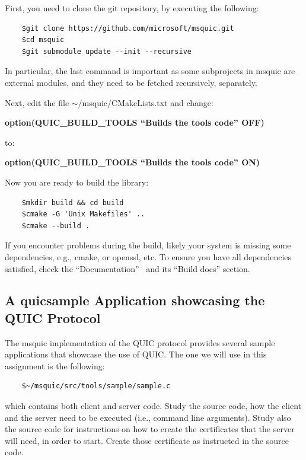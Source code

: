 \documentclass[11pt]{article}
\begin{document}
First, you need to clone the git repository, by executing the following:

\begin{verbatim}
    $git clone https://github.com/microsoft/msquic.git
    $cd msquic
    $git submodule update --init --recursive
\end{verbatim}

In particular, the last command is important as some subprojects in msquic are external modules, and they need to be fetched recursively, separately.

\vspace{5mm}

Next, edit the file $\sim$/msquic/CMakeLists.txt and change:

\textbf{option(QUIC\_BUILD\_TOOLS ``Builds the tools code'' OFF)}

to:

\textbf{option(QUIC\_BUILD\_TOOLS ``Builds the tools code'' ON)}

\vspace{5mm}

Now you are ready to build the library:

\begin{verbatim}
    $mkdir build && cd build
    $cmake -G 'Unix Makefiles' ..
    $cmake --build .
\end{verbatim}

If you encounter problems during the build, likely your system is missing some dependencies, e.g., cmake, or openssl, etc. To ensure you have all dependencies satisfied, check the ``Documentation''~\cite{msquic} and its ``Build docs'' section.

\subsection{A quicsample Application showcasing the QUIC Protocol}
The msquic implementation of the QUIC protocol provides several sample applications that showcase the use of QUIC. The one we will use in this assignment is the following:

\begin{verbatim}
    $~/msquic/src/tools/sample/sample.c
\end{verbatim}
which contains both client and server code. Study the source code, how the client and the server need to be executed (i.e., command line arguments). Study also the source code for instructions on how to create the certificates that the server will need, in order to start. Create those certificate as instructed in the source code.
\end{document}

